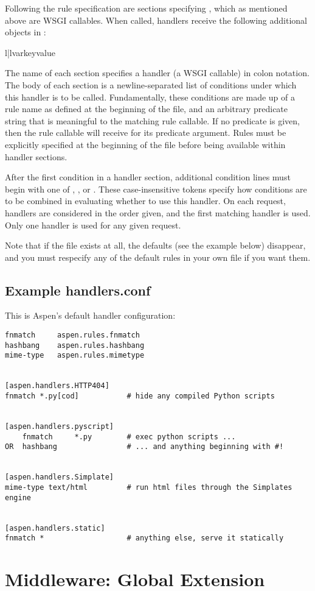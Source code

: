 Following the rule specification are sections specifying , which
as mentioned above are WSGI callables. When called, handlers receive the
following additional objects in :

\begin{tableii}{l|l}{var}{key}{value}
\end{tableii}

The name of each section specifies a handler (a WSGI callable) in colon
notation. The body of each section is a newline-separated list of conditions
under which this handler is to be called. Fundamentally, these conditions are
made up of a rule name as defined at the beginning of the file, and an arbitrary
predicate string that is meaningful to the matching rule callable. If no
predicate is given, then the rule callable will receive  for its
predicate argument. Rules must be explicitly specified at the beginning of the
file before being available within handler sections.


After the first condition in a handler section, additional condition lines must
begin with one of , , or . These case-insensitive
tokens specify how conditions are to be combined in evaluating whether to use
this handler. On each request, handlers are considered in the order given, and
the first matching handler is used. Only one handler is used for any given
request.

Note that if the file  exists at all, the defaults
(see the example below) disappear, and you must respecify any of the default
rules in your own file if you want them.


\subsection{Example handlers.conf \label{handlers.conf}}
This is Aspen's default handler configuration:

\begin{verbatim}
fnmatch     aspen.rules.fnmatch
hashbang    aspen.rules.hashbang
mime-type   aspen.rules.mimetype


[aspen.handlers.HTTP404]
fnmatch *.py[cod]           # hide any compiled Python scripts


[aspen.handlers.pyscript]
    fnmatch     *.py        # exec python scripts ...
OR  hashbang                # ... and anything beginning with #!


[aspen.handlers.Simplate]
mime-type text/html         # run html files through the Simplates engine


[aspen.handlers.static]
fnmatch *                   # anything else, serve it statically
\end{verbatim}


\section{Middleware: Global Extension \label{middleware}}

